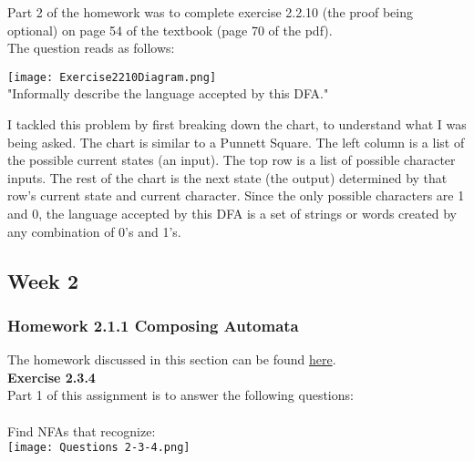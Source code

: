 \documentclass{article}
\theoremstyle{theorem}
\theoremstyle{definition}
\theoremstyle{remark}
\begin{document}
Part 2 of the homework was to complete exercise 2.2.10 (the proof being optional) on page 54 of the textbook (page 70 of the pdf).\\
The question reads as follows:
\begin{center}
    \texttt{[image: Exercise2210Diagram.png]}\\
"Informally describe the language accepted by this DFA."
\end{center}
I tackled this problem by first breaking down the chart, to understand what I was being asked. The chart is similar to a Punnett Square. The left column is a list of the possible current states (an input). The top row is a list of possible character inputs. The rest of the chart is the next state (the output) determined by that row's current state and current character. Since the only possible characters are 1 and 0, the language accepted by this DFA is a set of strings or words created by any combination of 0's and 1's. 


\subsection{Week 2}

\subsubsection{Homework 2.1.1 Composing Automata}
The homework discussed in this section can be found \href{https://hackmd.io/@alexhkurz/ryV_FU7XI}{here}.\\
\textbf{Exercise 2.3.4}\\
Part 1 of this assignment is to answer the following questions:\\
\\
Find NFAs that recognize:\\
\texttt{[image: Questions 2-3-4.png]}\\
\end{document}
